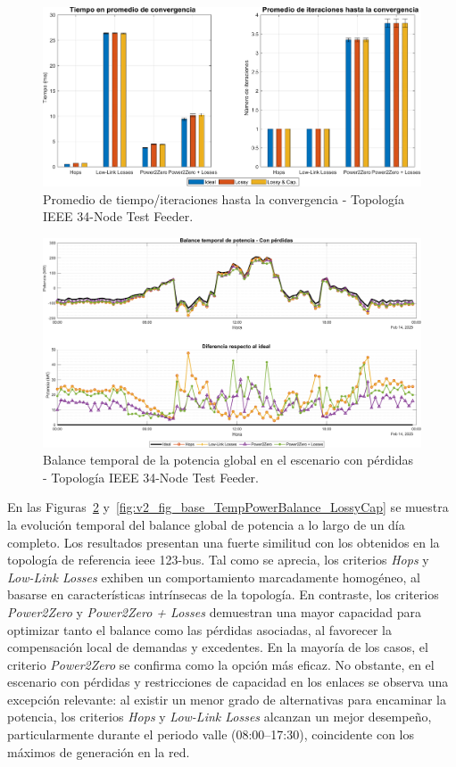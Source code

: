 \begin{figure}[ht!]
    \centering
    \includegraphics[width=\textwidth]{fig/07_bloste/bloste_19.pdf}
    \caption{Promedio de tiempo/iteraciones hasta la convergencia - Topología IEEE 34-Node Test Feeder.}
    \label{fig:v2_fig_base_global_time_iter}
\end{figure}


\begin{figure}[ht!]
    \centering
    \includegraphics[width=\textwidth]{fig/07_bloste/bloste_20.pdf}
    \caption{Balance temporal de la potencia global en el escenario con pérdidas - Topología IEEE 34-Node Test Feeder.}
    \label{fig:v2_fig_base_TempPowerBalance_Lossy}
\end{figure}

En las Figuras~\ref{fig:v2_fig_base_TempPowerBalance_Lossy} y~\ref{fig:v2_fig_base_TempPowerBalance_LossyCap} se muestra la evolución temporal del balance global de potencia a lo largo de un día completo. Los resultados presentan una fuerte similitud con los obtenidos en la topología de referencia \gls{ieee} 123-bus. Tal como se aprecia, los criterios \textit{Hops} y \textit{Low-Link Losses} exhiben un comportamiento marcadamente homogéneo, al basarse en características intrínsecas de la topología. En contraste, los criterios \textit{Power2Zero} y \textit{Power2Zero + Losses} demuestran una mayor capacidad para optimizar tanto el balance como las pérdidas asociadas, al favorecer la compensación local de demandas y excedentes. En la mayoría de los casos, el criterio \textit{Power2Zero} se confirma como la opción más eficaz. No obstante, en el escenario con pérdidas y restricciones de capacidad en los enlaces se observa una excepción relevante: al existir un menor grado de alternativas para encaminar la potencia, los criterios \textit{Hops} y \textit{Low-Link Losses} alcanzan un mejor desempeño, particularmente durante el periodo valle (08:00–17:30), coincidente con los máximos de generación en la red.


